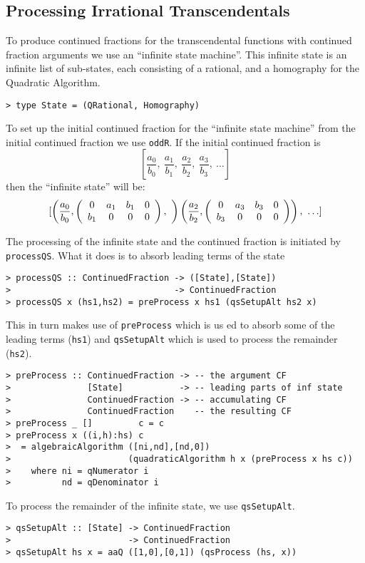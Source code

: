 \subsection{Processing Irrational Transcendentals}

To produce continued fractions for the transcendental functions with
continued fraction arguments we use an ``infinite state machine''.
This infinite state is an infinite list of sub-states, each consisting
of a rational, and a homography for the Quadratic Algorithm.
\begin{verbatim}
> type State = (QRational, Homography)
\end{verbatim}
%
To set up the initial continued fraction for the ``infinite state
machine'' from the initial continued fraction we use \mbox{\tt oddR}.
If the initial continued fraction is
\[[\frac{a_0}{b_0},~\frac{a_1}{b_1},~\frac{a_2}{b_2},~\frac{a_3}{b_3},~\ldots]\]
then the ``infinite state'' will be:
\[[\left(\frac{a_0}{b_0},
   \left(\begin{array}[c]{cccc}0&a_1&b_1&0\\b_1&0&0&0\end{array}\right),~
\right)
\left(\frac{a_2}{b_2},
   \left(\begin{array}[c]{cccc}0&a_3&b_3&0\\b_3&0&0&0\end{array}\right)
\right),~
\ldots]\]

The processing of the infinite state and the continued fraction is
initiated by \mbox{\tt processQS}. What it does is to absorb
 leading terms of the state

\begin{verbatim}
> processQS :: ContinuedFraction -> ([State],[State])
>                                -> ContinuedFraction
> processQS x (hs1,hs2) = preProcess x hs1 (qsSetupAlt hs2 x)
\end{verbatim}
%
%
This in turn makes use of \mbox{\tt preProcess} which is us
ed to absorb some of
the leading terms (\mbox{\tt hs1}) and \mbox{\tt qsSetupAlt} which is used to process
the remainder (\mbox{\tt hs2}).
\begin{verbatim}
> preProcess :: ContinuedFraction -> -- the argument CF
>               [State]           -> -- leading parts of inf state
>               ContinuedFraction -> -- accumulating CF
>               ContinuedFraction    -- the resulting CF
> preProcess _ []         c = c
> preProcess x ((i,h):hs) c
>  = algebraicAlgorithm ([ni,nd],[nd,0]) 
>                       (quadraticAlgorithm h x (preProcess x hs c))
>    where ni = qNumerator i
>          nd = qDenominator i
\end{verbatim}
%
%
%
To process the remainder of the infinite state, we use \mbox{\tt qsSetupAlt}.
\begin{verbatim}
> qsSetupAlt :: [State] -> ContinuedFraction
>                       -> ContinuedFraction
> qsSetupAlt hs x = aaQ ([1,0],[0,1]) (qsProcess (hs, x))
\end{verbatim}
%
%
